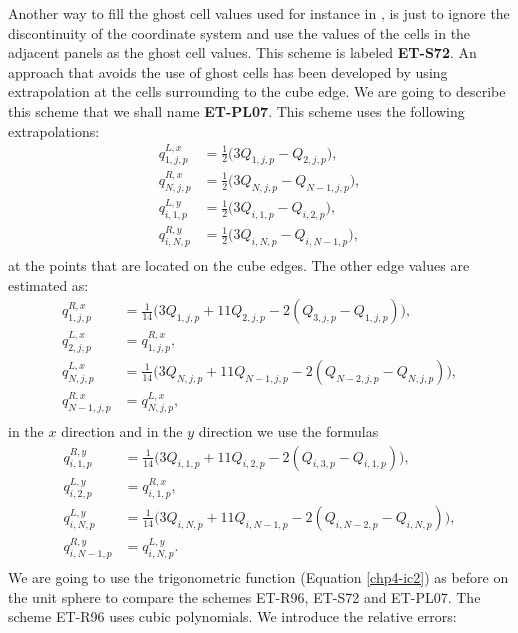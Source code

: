 Another way to fill the ghost cell values used for instance in \citet{sadourny:1972}, is just to ignore the discontinuity of the coordinate 
system and use the values of the cells in the adjacent panels as the ghost cell values. This scheme is labeled  \textbf{ET-S72}.
An approach that avoids the use of ghost cells has been developed by \citet{putman:2007} using 
extrapolation at the cells surrounding to the cube edge.
We are going to describe this scheme that we shall name \textbf{ET-PL07}. This scheme uses the following extrapolations:
\begin{align*}
	q^{L,x}_{1,j,p} &= \frac{1}{2}\bigg(3Q_{1,j,p} - Q_{2,j,p}\bigg),\\
	q^{R,x}_{N,j,p} &= \frac{1}{2}\bigg(3Q_{N,j,p} - Q_{N-1,j,p}\bigg),\\
	q^{L,y}_{i,1,p} &= \frac{1}{2}\bigg(3Q_{i,1,p} - Q_{i,2,p}\bigg),\\
	q^{R,y}_{i,N,p} &= \frac{1}{2}\bigg(3Q_{i,N,p} - Q_{i,N-1,p}\bigg),\\
\end{align*}
at the points that are located on the cube edges. The other edge values are estimated as:
\begin{align*}
	q^{R,x}_{1,j,p} &= \frac{1}{14}\bigg(3Q_{1,j,p} + 11Q_{2,j,p} - 2(Q_{3,j,p} - Q_{1,j,p})\bigg),\\
	q^{L,x}_{2,j,p} &= q^{R,x}_{1,j,p},\\
	q^{L,x}_{N,j,p} &= \frac{1}{14}\bigg(3Q_{N,j,p} + 11Q_{N-1,j,p} - 2(Q_{N-2,j,p} - Q_{N,j,p})\bigg),\\
	q^{R,x}_{N-1,j,p} &= q^{L,x}_{N,j,p},\\
\end{align*}
in the $x$ direction and in the $y$ direction we use the formulas
\begin{align*}
	q^{R,y}_{i,1,p} &= \frac{1}{14}\bigg(3Q_{i,1,p} + 11Q_{i,2,p} - 2(Q_{i,3,p} - Q_{i,1,p})\bigg),\\
	q^{L,y}_{i,2,p} &= q^{R,x}_{i,1,p},\\
	q^{L,y}_{i,N,p} &= \frac{1}{14}\bigg(3Q_{i,N,p} + 11Q_{i,N-1,p} - 2(Q_{i,N-2,p} - Q_{i,N,p})\bigg),\\
	q^{R,y}_{i,N-1,p} &= q^{L,y}_{i,N,p}.\\
\end{align*}
We are going to use the trigonometric function (Equation \eqref{chp4-ic2})
as before on the unit sphere to compare the schemes ET-R96, ET-S72 and ET-PL07. The scheme ET-R96 uses cubic polynomials.
We introduce the relative errors:

